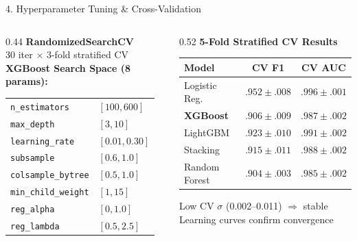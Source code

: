 \documentclass[aspectratio=169, 10pt]{beamer}
\begin{document}
\begin{frame}{4. Hyperparameter Tuning \& Cross-Validation}
\small
\begin{columns}[T]
\begin{column}{0.44\textwidth}
  \textbf{\color{teal}RandomizedSearchCV}\\
  \footnotesize 30 iter $\times$ 3-fold stratified CV\\[4pt]
  \textbf{XGBoost Search Space (8 params):}\\[2pt]
  \scriptsize
  \begin{tabular}{@{}l l@{}}
    \texttt{n\_estimators}     & $[100, 600]$ \\
    \texttt{max\_depth}        & $[3, 10]$ \\
    \texttt{learning\_rate}    & $[0.01, 0.30]$ \\
    \texttt{subsample}         & $[0.6, 1.0]$ \\
    \texttt{colsample\_bytree} & $[0.5, 1.0]$ \\
    \texttt{min\_child\_weight} & $[1, 15]$ \\
    \texttt{reg\_alpha}        & $[0, 1.0]$ \\
    \texttt{reg\_lambda}       & $[0.5, 2.5]$ \\
  \end{tabular}
\end{column}
\begin{column}{0.52\textwidth}
  \textbf{\color{amber}5-Fold Stratified CV Results}\\[4pt]
  \footnotesize
  \begin{tabular}{@{}l c c@{}}
    \toprule
    \textbf{Model} & \textbf{CV F1} & \textbf{CV AUC} \\
    \midrule
    Logistic Reg.       & $.952 \pm .008$ & $.996 \pm .001$ \\
    \rowcolor{teal!15}
    \textbf{XGBoost}    & $\mathbf{.906 \pm .009}$ & $\mathbf{.987 \pm .002}$ \\
    LightGBM            & $.923 \pm .010$ & $.991 \pm .002$ \\
    Stacking            & $.915 \pm .011$ & $.988 \pm .002$ \\
    Random Forest       & $.904 \pm .003$ & $.985 \pm .002$ \\
    \bottomrule
  \end{tabular}

  \small
  \vspace{6pt}
  Low CV $\sigma$ (0.002--0.011) $\Rightarrow$ stable\\
  Learning curves confirm convergence
\end{column}
\end{columns}
\end{frame}
\end{document}
